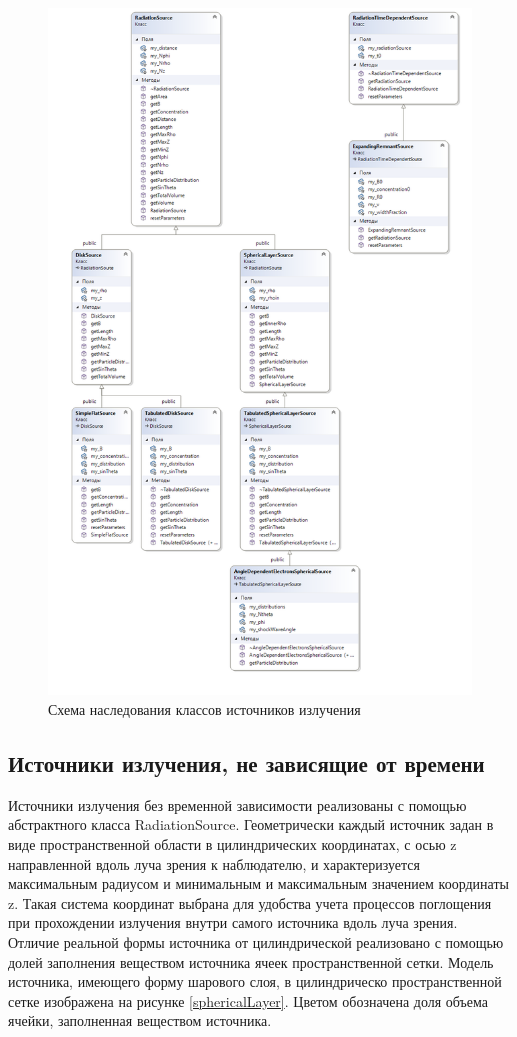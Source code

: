 \begin{figure}
	\centering
	\includegraphics[width=14.5 cm]{./fig/radiationSource.png} 
	\caption{Схема наследования классов источников излучения}
	\label{radiationSource}
\end{figure}

\subsection{Источники излучения, не зависящие от времени}
Источники излучения без временной зависимости реализованы с помощью абстрактного класса RadiationSource. Геометрически каждый источник задан в виде пространственной области в цилиндрических координатах, с осью z направленной вдоль луча зрения к наблюдателю, и характеризуется максимальным радиусом и минимальным и максимальным значением координаты z. Такая система координат выбрана для удобства учета процессов поглощения при прохождении излучения внутри самого источника вдоль луча зрения. Отличие реальной формы источника от цилиндрической реализовано с помощью долей заполнения веществом источника ячеек пространственной сетки. Модель источника, имеющего форму шарового слоя, в цилиндрическо пространственной сетке изображена на рисунке \ref{sphericalLayer}. Цветом обозначена доля объема ячейки, заполненная веществом источника.

